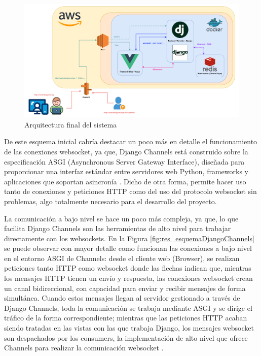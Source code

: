\begin{figure}[ht!]
	\centering
	\includegraphics[width=\textwidth,clip=true]{res_arquitecturaSoftware.pdf}
	\caption{Arquitectura final del sistema}
	\label{fig:res_arquitecturaSoftware}
\end{figure}

De este esquema inicial cabría destacar un poco más en detalle el funcionamiento de las conexiones websocket, ya que, Django Channels 
está construido sobre la especificación ASGI (Asynchronous Server Gateway Interface), diseñada para proporcionar una interfaz estándar entre servidores web Python, frameworks y aplicaciones que soportan asincronía \cite{ASGI}. Dicho de otra forma,
permite hacer uso tanto de conexiones y peticiones HTTP como del uso del protocolo websocket sin problemas, algo totalmente necesario para el desarrollo del proyecto. 

La comunicación a bajo nivel se hace un poco más compleja, ya que, lo que facilita Django Channels son las herramientas de alto
nivel para trabajar directamente con los websockets. En la Figura \ref{fig:res_esquemaDjangoChannels} se puede observar con mayor detalle como funcionan
las conexiones a bajo nivel en el entorno ASGI de Channels: desde el cliente web (Browser), se realizan peticiones
tanto HTTP como websocket donde las flechas indican que, mientras los mensajes HTTP tienen un envío y respuesta, las conexiones websocket crean 
un canal bidireccional, con capacidad para enviar y recibir mensajes de forma simultánea. Cuando estos mensajes llegan al servidor gestionado
a través de Django Channels, toda la comunicación se trabaja mediante ASGI y se dirige el tráfico de la forma correspondiente; mientras que las peticiones HTTP
acaban siendo tratadas en las vistas con las que trabaja Django, los mensajes websocket son despachados por los consumers, la implementación de 
alto nivel que ofrece Channels para realizar la comunicación websocket \cite{websocketMDN} \cite{whatIsDjangoChannels}.

